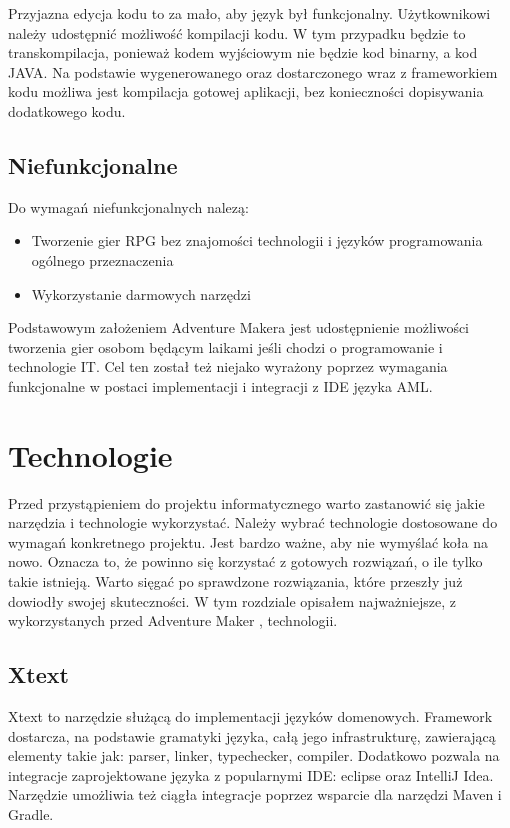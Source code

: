 \documentclass	{xmgr}
\begin{document}
Przyjazna edycja kodu to za mało, aby język był funkcjonalny. Użytkownikowi należy udostępnić możliwość kompilacji kodu. W tym przypadku będzie to transkompilacja, ponieważ kodem wyjściowym nie będzie kod binarny, a kod JAVA. Na podstawie wygenerowanego oraz dostarczonego wraz z frameworkiem kodu możliwa jest kompilacja gotowej aplikacji, bez konieczności dopisywania dodatkowego kodu. 

\section{Niefunkcjonalne}
Do wymagań niefunkcjonalnych nalezą:
\begin{itemize}
	\item Tworzenie gier RPG bez znajomości technologii i języków programowania ogólnego przeznaczenia
	\item Wykorzystanie darmowych narzędzi
\end{itemize}

Podstawowym założeniem Adventure Makera jest udostępnienie możliwości tworzenia gier osobom będącym laikami jeśli chodzi o programowanie i technologie IT. Cel ten został też niejako wyrażony poprzez wymagania funkcjonalne w postaci implementacji i integracji z IDE języka AML.

\chapter{Technologie}
Przed przystąpieniem do projektu informatycznego warto zastanowić się jakie narzędzia i technologie wykorzystać. Należy wybrać technologie dostosowane do wymagań konkretnego projektu. Jest bardzo ważne, aby nie wymyślać koła na nowo. Oznacza to, że powinno się korzystać z gotowych rozwiązań, o ile tylko takie istnieją. Warto sięgać po sprawdzone rozwiązania, które przeszły już dowiodły swojej skuteczności. W tym rozdziale opisałem najważniejsze, z wykorzystanych przed Adventure Maker , technologii.

\section{Xtext}

Xtext \cite{Xtext:2017:Doc} to narzędzie służącą do implementacji języków domenowych. Framework dostarcza, na podstawie gramatyki języka, całą jego infrastrukturę, zawierającą elementy takie jak: parser, linker, typechecker, compiler. Dodatkowo pozwala na integracje zaprojektowane języka z popularnymi IDE: eclipse oraz IntelliJ Idea. Narzędzie umożliwia też ciągła integracje poprzez wsparcie dla narzędzi Maven i Gradle.
\end{document}
